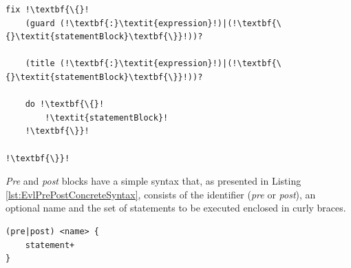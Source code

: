 \begin{lstlisting}[float=t, caption=Concrete Syntax of an EVL fix, label=lst:FixConcreteSyntax, language=EVL, escapechar=!]
fix !\textbf{\{}!
	(guard (!\textbf{:}\textit{expression}!)|(!\textbf{\{}\textit{statementBlock}\textbf{\}}!))?
	
	(title (!\textbf{:}\textit{expression}!)|(!\textbf{\{}\textit{statementBlock}\textbf{\}}!))?
	
	do !\textbf{\{}!
		!\textit{statementBlock}!
	!\textbf{\}}!
	
!\textbf{\}}!
\end{lstlisting}

\emph{Pre} and \emph{post} blocks have a simple syntax that, as presented in Listing \ref{lst:EvlPrePostConcreteSyntax}, consists of the identifier (\emph{pre} or \emph{post}), an optional name and the set of statements to be executed enclosed in curly braces.

\begin{lstlisting}[float=t, caption=Concrete Syntax of Pre and Post blocks, label=lst:EvlPrePostConcreteSyntax, language=EVL]
(pre|post) <name> {
	statement+
}
\end{lstlisting}





